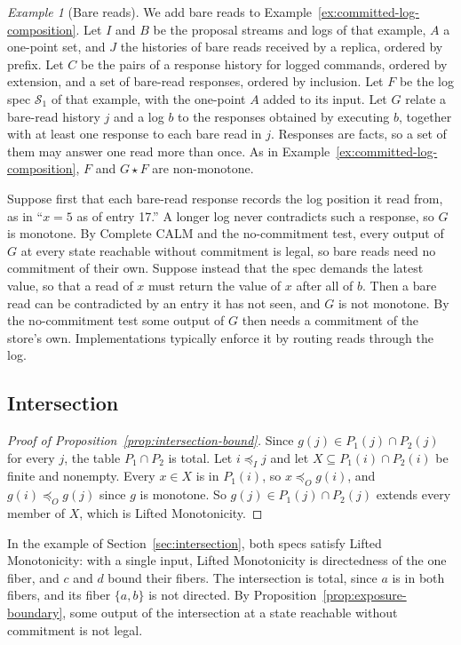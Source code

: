 \documentclass[sigconf]{cidr-2027}
\theoremstyle{remark}
\newtheorem{example}{Example}
\newcommand{\InputOrd}{\preceq_I}
\newcommand{\OutputOrd}{\preceq_O}
\newcommand{\commitment}{commitment\xspace}
\newcommand{\outrel}{extends\xspace}          %
\newcommand{\Spec}{\mathcal{S}}
\begin{document}
\color{blue!70!black}\begin{example}[Bare reads]
\label{ex:bare-reads}
We add bare reads to Example~\ref{ex:committed-log-composition}.  Let $I$
and $B$ be the proposal streams and logs of that example, $A$ a one-point set,
and $J$ the histories of bare reads received by a replica, ordered by prefix.
Let $C$ be the pairs of a response history for logged commands, ordered by
extension, and a set of bare-read responses, ordered by inclusion.  Let $F$ be
the log spec $\Spec_1$ of that example, with the one-point $A$
added to its input.  Let $G$ relate a bare-read history $j$ and a log $b$ to
the responses obtained by executing $b$, together with at least one response to
each bare read in $j$.  Responses are facts, so a set of them may answer one
read more than once.  As in Example~\ref{ex:committed-log-composition}, $F$
and $G\star F$ are non-monotone.\color{black}

Suppose first that each bare-read response records the log position it read
from, as in ``$x=5$ as of entry 17.''  A longer log never contradicts such a
response, so $G$ is monotone.  By Complete CALM and the no-\commitment test,
every output of $G$ at every state reachable without \commitment is
legal, so bare reads need no \commitment of their own.  Suppose instead
that the spec demands the latest value, so that a read of $x$ must
return the value of $x$ after all of $b$.  Then a bare read can be
contradicted by an entry it has not seen, and $G$ is not monotone.  By the
no-\commitment test some output of $G$ then needs a \commitment of the store's
own.  Implementations typically enforce it by routing reads through the log.
\end{example}

\subsection{Intersection}
\label{app:intersection}

\begin{proof}[Proof of Proposition~\ref{prop:intersection-bound}]
Since $g(j)\in P_1(j)\cap P_2(j)$ for every $j$, the table $P_1\cap P_2$ is
total.  Let $i\InputOrd j$ and let $X\subseteq P_1(i)\cap P_2(i)$ be finite and
nonempty.  Every $x\in X$ is in $P_1(i)$, so $x\OutputOrd g(i)$, and
$g(i)\OutputOrd g(j)$ since $g$ is monotone.  So $g(j)\in P_1(j)\cap P_2(j)$
\outrel every member of $X$, which is Lifted Monotonicity.
\end{proof}

In the example of Section~\ref{sec:intersection}, both specs satisfy Lifted
Monotonicity: with a single input, Lifted Monotonicity is directedness of the
one fiber, and $c$ and $d$ bound their fibers.  The intersection is total, since
$a$ is in both fibers, and its fiber $\{a,b\}$ is not directed.  By
Proposition~\ref{prop:exposure-boundary}, some output of the intersection at a
state reachable without \commitment is not legal.
\end{document}
